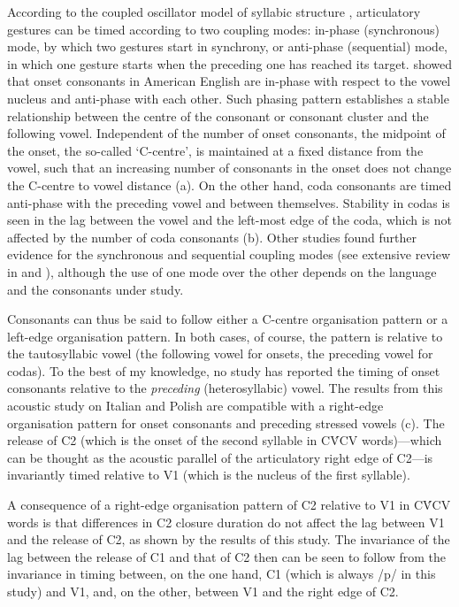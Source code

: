 \documentclass[preprint]{JASAnew}
\begin{document}
According to the coupled oscillator model of syllabic structure
\citep{browman1988, browman2000, goldstein2006, goldstein2014},
articulatory gestures can be timed according to two coupling modes:
in-phase (synchronous) mode, by which two gestures start in synchrony,
or anti-phase (sequential) mode, in which one gesture starts when the
preceding one has reached its target. \citet{marin2010} showed that
onset consonants in American English are in-phase with respect to the
vowel nucleus and anti-phase with each other. Such phasing pattern
establishes a stable relationship between the centre of the consonant or
consonant cluster and the following vowel. Independent of the number of
onset consonants, the midpoint of the onset, the so-called `C-centre',
is maintained at a fixed distance from the vowel, such that an
increasing number of consonants in the onset does not change the
C-centre to vowel distance (a). On the other hand,
coda consonants are timed anti-phase with the preceding vowel and
between themselves. Stability in codas is seen in the lag between the
vowel and the left-most edge of the coda, which is not affected by the
number of coda consonants (b). Other studies found
further evidence for the synchronous and sequential coupling modes (see
extensive review in \citealt{marin2010} and \citealt{marin2014}),
although the use of one mode over the other depends on the language and
the consonants under study.

Consonants can thus be said to follow either a C-centre organisation
pattern or a left-edge organisation pattern. In both cases, of course,
the pattern is relative to the tautosyllabic vowel (the following vowel
for onsets, the preceding vowel for codas). To the best of my knowledge,
no study has reported the timing of onset consonants relative to the
\emph{preceding} (heterosyllabic) vowel. The results from this acoustic
study on Italian and Polish are compatible with a right-edge
organisation pattern for onset consonants and preceding stressed vowels
(c). The release of C2 (which is the onset of the
second syllable in CV́CV words)---which can be thought as the acoustic
parallel of the articulatory right edge of C2---is invariantly timed
relative to V1 (which is the nucleus of the first syllable).

A consequence of a right-edge organisation pattern of C2 relative to V1
in CV́CV words is that differences in C2 closure duration do not affect
the lag between V1 and the release of C2, as shown by the results of
this study. The invariance of the lag between the release of C1 and that
of C2 then can be seen to follow from the invariance in timing between,
on the one hand, C1 (which is always /p/ in this study) and V1, and, on
the other, between V1 and the right edge of C2.
\end{document}
